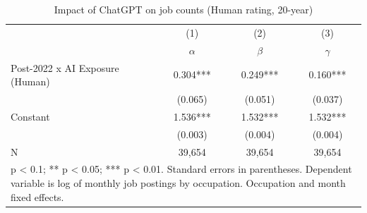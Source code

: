 \begin{table}[h]\centering
\def\sym#1{\ifmmode^{#1}\else\(^{#1}\)\fi}
\caption{Impact of ChatGPT on job counts (Human rating, 20-year) \label{tab:did_postings_20yr_human}}
\begin{tabular}{l*{3}{c}}
\hline\hline
                    &\multicolumn{1}{c}{(1)}&\multicolumn{1}{c}{(2)}&\multicolumn{1}{c}{(3)}\\
                    &\multicolumn{1}{c}{$\alpha$}&\multicolumn{1}{c}{$\beta$}&\multicolumn{1}{c}{$\gamma$}\\
\hline
Post-2022 x AI Exposure (Human)&       0.304***&       0.249***&       0.160***\\
                    &     (0.065)   &     (0.051)   &     (0.037)   \\
Constant            &       1.536***&       1.532***&       1.532***\\
                    &     (0.003)   &     (0.004)   &     (0.004)   \\
\hline
N                   &      39,654   &      39,654   &      39,654   \\
\hline\hline
\multicolumn{4}{p{0.7\linewidth}}{\footnotesize * p < 0.1; ** p < 0.05; *** p < 0.01. Standard errors in parentheses. Dependent variable is log of monthly job postings by occupation. Occupation and month fixed effects.}\\
\end{tabular}
\end{table}
